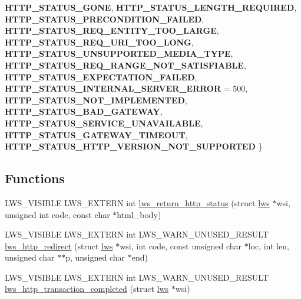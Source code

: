 \begin{DoxyCompactItemize}
{\bfseries H\+T\+T\+P\+\_\+\+S\+T\+A\+T\+U\+S\+\_\+\+G\+O\+NE}, 
{\bfseries H\+T\+T\+P\+\_\+\+S\+T\+A\+T\+U\+S\+\_\+\+L\+E\+N\+G\+T\+H\+\_\+\+R\+E\+Q\+U\+I\+R\+ED}, 
\newline
{\bfseries H\+T\+T\+P\+\_\+\+S\+T\+A\+T\+U\+S\+\_\+\+P\+R\+E\+C\+O\+N\+D\+I\+T\+I\+O\+N\+\_\+\+F\+A\+I\+L\+ED}, 
{\bfseries H\+T\+T\+P\+\_\+\+S\+T\+A\+T\+U\+S\+\_\+\+R\+E\+Q\+\_\+\+E\+N\+T\+I\+T\+Y\+\_\+\+T\+O\+O\+\_\+\+L\+A\+R\+GE}, 
{\bfseries H\+T\+T\+P\+\_\+\+S\+T\+A\+T\+U\+S\+\_\+\+R\+E\+Q\+\_\+\+U\+R\+I\+\_\+\+T\+O\+O\+\_\+\+L\+O\+NG}, 
{\bfseries H\+T\+T\+P\+\_\+\+S\+T\+A\+T\+U\+S\+\_\+\+U\+N\+S\+U\+P\+P\+O\+R\+T\+E\+D\+\_\+\+M\+E\+D\+I\+A\+\_\+\+T\+Y\+PE}, 
\newline
{\bfseries H\+T\+T\+P\+\_\+\+S\+T\+A\+T\+U\+S\+\_\+\+R\+E\+Q\+\_\+\+R\+A\+N\+G\+E\+\_\+\+N\+O\+T\+\_\+\+S\+A\+T\+I\+S\+F\+I\+A\+B\+LE}, 
{\bfseries H\+T\+T\+P\+\_\+\+S\+T\+A\+T\+U\+S\+\_\+\+E\+X\+P\+E\+C\+T\+A\+T\+I\+O\+N\+\_\+\+F\+A\+I\+L\+ED}, 
{\bfseries H\+T\+T\+P\+\_\+\+S\+T\+A\+T\+U\+S\+\_\+\+I\+N\+T\+E\+R\+N\+A\+L\+\_\+\+S\+E\+R\+V\+E\+R\+\_\+\+E\+R\+R\+OR} = 500, 
{\bfseries H\+T\+T\+P\+\_\+\+S\+T\+A\+T\+U\+S\+\_\+\+N\+O\+T\+\_\+\+I\+M\+P\+L\+E\+M\+E\+N\+T\+ED}, 
\newline
{\bfseries H\+T\+T\+P\+\_\+\+S\+T\+A\+T\+U\+S\+\_\+\+B\+A\+D\+\_\+\+G\+A\+T\+E\+W\+AY}, 
{\bfseries H\+T\+T\+P\+\_\+\+S\+T\+A\+T\+U\+S\+\_\+\+S\+E\+R\+V\+I\+C\+E\+\_\+\+U\+N\+A\+V\+A\+I\+L\+A\+B\+LE}, 
{\bfseries H\+T\+T\+P\+\_\+\+S\+T\+A\+T\+U\+S\+\_\+\+G\+A\+T\+E\+W\+A\+Y\+\_\+\+T\+I\+M\+E\+O\+UT}, 
{\bfseries H\+T\+T\+P\+\_\+\+S\+T\+A\+T\+U\+S\+\_\+\+H\+T\+T\+P\+\_\+\+V\+E\+R\+S\+I\+O\+N\+\_\+\+N\+O\+T\+\_\+\+S\+U\+P\+P\+O\+R\+T\+ED}
 \}
\end{DoxyCompactItemize}
\subsection*{Functions}
\begin{DoxyCompactItemize}
\item 
L\+W\+S\+\_\+\+V\+I\+S\+I\+B\+LE L\+W\+S\+\_\+\+E\+X\+T\+E\+RN int \hyperlink{group__http_gac8a4a71240857dc6b2ed70456b6923f4}{lws\+\_\+return\+\_\+http\+\_\+status} (struct \hyperlink{structlws}{lws} $\ast$wsi, unsigned int code, const char $\ast$html\+\_\+body)
\item 
L\+W\+S\+\_\+\+V\+I\+S\+I\+B\+LE L\+W\+S\+\_\+\+E\+X\+T\+E\+RN int L\+W\+S\+\_\+\+W\+A\+R\+N\+\_\+\+U\+N\+U\+S\+E\+D\+\_\+\+R\+E\+S\+U\+LT \hyperlink{group__http_ga8fbf01e473ac421fc33ad9f8da8b8a25}{lws\+\_\+http\+\_\+redirect} (struct \hyperlink{structlws}{lws} $\ast$wsi, int code, const unsigned char $\ast$loc, int len, unsigned char $\ast$$\ast$p, unsigned char $\ast$end)
\item 
L\+W\+S\+\_\+\+V\+I\+S\+I\+B\+LE L\+W\+S\+\_\+\+E\+X\+T\+E\+RN int L\+W\+S\+\_\+\+W\+A\+R\+N\+\_\+\+U\+N\+U\+S\+E\+D\+\_\+\+R\+E\+S\+U\+LT \hyperlink{group__http_gad27aed6c66a41b2b89ffe4da2a309e8a}{lws\+\_\+http\+\_\+transaction\+\_\+completed} (struct \hyperlink{structlws}{lws} $\ast$wsi)
\end{DoxyCompactItemize}


